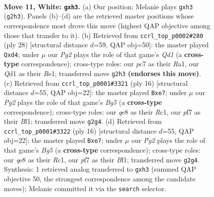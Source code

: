 \documentclass[11pt]{article}
\begin{document}
\clearpage

\begin{figure}[p]\centering
\begin{subfigure}{0.46\textwidth}\centering
\resizebox{\linewidth}{!}{%
\newchessgame
\chessboard[
  setfen={rn2qrk1/ppp1pp1p/5bp1/3P4/2B1P3/B1P4b/P4PPP/R2QK2R w KQ - 0 11},
  showmover=false,
  pgfstyle=straightmove, color=movearrow, markmove={g2-h3}
]}
\caption{}
\end{subfigure}\hfill
\begin{subfigure}{0.46\textwidth}\centering
\resizebox{\linewidth}{!}{%
\newchessgame
\chessboard[
  setfen={r2q1rk1/pp1bpp1p/3p2p1/8/2BbP3/2P4P/PP3PP1/R2QR1K1 w - - 0 15},
  showmover=false,
  pgfstyle=straightmove, color=movearrow, markmove={d1-d4}
]}
\caption{}
\end{subfigure}
\\[4pt]
\begin{subfigure}{0.46\textwidth}\centering
\resizebox{\linewidth}{!}{%
\newchessgame
\chessboard[
  setfen={rnbq1rk1/p1p1bppp/1p6/3p2B1/3P4/4P3/PP3PPP/2RQKBNR w K - 0 9},
  showmover=false,
  pgfstyle=straightmove, color=movearrow, markmove={g5-e7}
]}
\caption{}
\end{subfigure}\hfill
\begin{subfigure}{0.46\textwidth}\centering
\resizebox{\linewidth}{!}{%
\newchessgame
\chessboard[
  setfen={rnbq1rk1/p1p1bppp/1p6/3p2B1/3P4/4P3/PP3PPP/2RQKBNR w K - 0 9},
  showmover=false,
  pgfstyle=straightmove, color=movearrow, markmove={g5-e7}
]}
\caption{}
\end{subfigure}
\caption{\textbf{Move 11, White: \texttt{gxh3}.} (a) Our position; Melanie plays \texttt{gxh3} (\texttt{g2h3}). Panels (b)--(d) are the retrieved master positions whose correspondence most drove this move (highest QAP objective among those that transfer to it). (b) Retrieved from \texttt{ccrl\_top\_p0002\#280} (ply 28) [structural distance $d$=59, QAP obj=50]: the master played \texttt{Qxd4}; under $\mu$ our \emph{Pg2} plays the role of that game's \emph{Qd1} (a \textbf{cross-type} correspondence); cross-type roles: our \emph{p}c7 as their \emph{R}a1, our \emph{Q}d1 as their \emph{R}e1; transferred move \texttt{g2h3} \textbf{(endorses this move)}. (c) Retrieved from \texttt{ccrl\_top\_p0001\#3321} (ply 16) [structural distance $d$=55, QAP obj=22]: the master played \texttt{Bxe7}; under $\mu$ our \emph{Pg2} plays the role of that game's \emph{Bg5} (a \textbf{cross-type} correspondence); cross-type roles: our \emph{q}e8 as their \emph{R}c1, our \emph{p}f7 as their \emph{B}f1; transferred move \texttt{g2g4}. (d) Retrieved from \texttt{ccrl\_top\_p0001\#3322} (ply 16) [structural distance $d$=55, QAP obj=22]: the master played \texttt{Bxe7}; under $\mu$ our \emph{Pg2} plays the role of that game's \emph{Bg5} (a \textbf{cross-type} correspondence); cross-type roles: our \emph{q}e8 as their \emph{R}c1, our \emph{p}f7 as their \emph{B}f1; transferred move \texttt{g2g4}. Synthesis: 1 retrieved analog transferred to \texttt{gxh3} (summed QAP objective 50, the strongest correspondence among the candidate moves); Melanie committed it via the \texttt{search} selector.}
\label{fig:thought-m20}
\end{figure}
\end{document}
